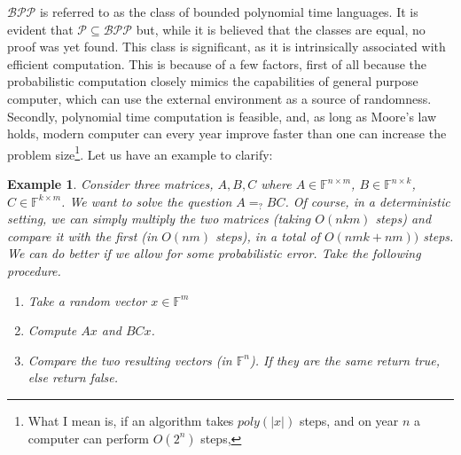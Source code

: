 \documentclass{article}
\newtheorem{example}{Example}
\begin{document}
$\mathcal{BPP}$ is referred to as the class of bounded polynomial time languages. It is evident that $\mathcal{P} \subseteq \mathcal{BPP}$ but, while it is believed that the classes are equal, no proof was yet found. This class is significant, as it is intrinsically associated with efficient computation. This is because of a few factors, first of all because the probabilistic computation closely mimics the capabilities of general purpose computer, which can use the external environment as a source of randomness. Secondly, polynomial time computation is feasible, and, as long as Moore's law holds, modern computer can every year improve faster than one can increase the problem size\footnote{What I mean is, if an algorithm takes $poly(|x|)$ steps, and on year $n$ a computer can perform $O(2^n)$ steps, }. Let us have an example to clarify:
\begin{example}
Consider three matrices, $A, B, C$ where $A \in \mathbb{F}^{n \times m}$, $B \in \mathbb{F}^{n \times k}$, $C \in \mathbb{F}^{k \times m}$. We want to solve the question $A =_? B C$. Of course, in a deterministic setting, we can simply multiply the two matrices (taking $O(nkm)$ steps) and compare it with the first (in $O(nm)$ steps), in a total of $O(nmk + nm))$ steps. We can do better if we allow for some probabilistic error. Take the following procedure.
\begin{enumerate}
    \item Take a random vector $x \in \mathbb{F}^m$
    \item Compute $Ax$ and $BCx$.
    \item Compare the two resulting vectors (in $\mathbb{F}^n$). If they are the same return true, else return false. 
\end{enumerate}

\end{example}
\end{document}

